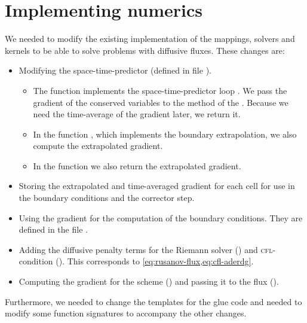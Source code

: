 \section{Implementing numerics}
We needed to modify the existing implementation of the mappings, solvers and kernels to be able to solve problems with diffusive fluxes.
These changes are:
\begin{itemize}
\item Modifying the space-time-predictor (defined in file ).
  \begin{itemize}
  \item The function  implements the space-time-predictor loop .
    We pass the gradient of the conserved variables to the  method of the .
    Because we need the time-average of the gradient later, we return it.
   \item In the function , which implements the boundary extrapolation, we also compute the extrapolated gradient.
    \item In the function  we also return the extrapolated gradient.
  \end{itemize}
\item Storing the extrapolated and time-averaged gradient for each cell for use in the boundary conditions and the corrector step.
\item Using the gradient for the computation of the boundary conditions.
  They are defined in the file .
\item Adding the diffusive penalty terms for the Riemann solver () and \textsc{cfl}-condition ().
  This corresponds to \cref{eq:rusanov-flux,eq:cfl-aderdg}.
\item Computing the gradient for the \muscl{} scheme () and passing it to the flux ().
\end{itemize}
Furthermore, we needed to change the templates for the glue code and needed to modify some function signatures to accompany the other changes.

